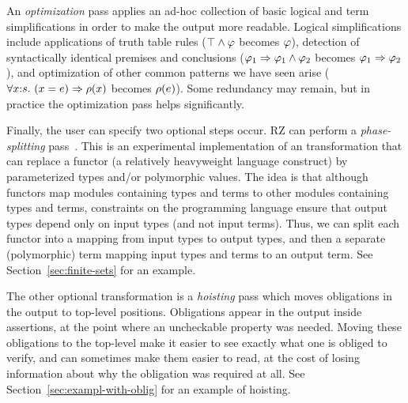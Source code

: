 \fi %
%
An \emph{optimization} pass applies an ad-hoc collection of
basic logical and term simplifications in order to make the output more readable. 
\iflong
Logical simplifications include applications of truth table rules
($\top\land \varphi$ becomes $\varphi$), detection of syntactically
identical premises and conclusions
($\varphi_1\Rightarrow \varphi_1\land \varphi_2$ becomes
$\varphi_1\Rightarrow \varphi_2$), and optimization of other common patterns we have
seen arise
($\forall x{:}s.\ (x = e)\Rightarrow \rho(x)$ becomes
$\rho(e)$).
\fi %
Some redundancy may remain, but in practice the optimization pass
helps significantly.

Finally, the user can specify two optional steps occur.
RZ can perform a \emph{phase-splitting} pass~\cite{harper+:popl90}. 
This is an experimental implementation of an transformation that can replace a functor (a relatively heavyweight language construct) by
parameterized types and/or polymorphic values. 
\iflong
The idea is that although
functors map modules containing types and terms to other modules containing types
and terms, constraints on the programming language ensure that output types
depend only on input types (and not input terms).  Thus, we can split each
functor into a mapping from input types to output types, and then a separate
(polymorphic) term mapping input types and terms to an output term.
See Section~\ref{sec:finite-sets} for an example.
\fi


The other optional transformation is a \emph{hoisting} pass which
moves obligations in the output to top-level positions.  Obligations
appear in the output inside assertions, at the point where an uncheckable property was needed.
Moving these obligations to the top-level 
make it easier to see exactly what one is obliged to verify, and can
sometimes make them easier to read, at the cost of losing information about
why the obligation was required at all. 
\iflong
See
Section~\ref{sec:exampl-with-oblig} for an example of hoisting.
\fi %

